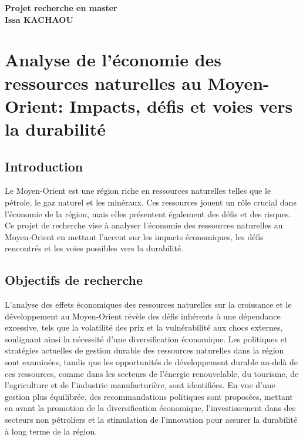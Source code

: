 \documentclass[a4paper, 12pt]{report}
\begin{document}
\thispagestyle{empty}	
\begin{center}
	\vspace*{5cm}\Huge{{\sc\textbf{Projet recherche en master}}} \\ \vspace*{5cm}
	\textbf{Issa KACHAOU}
\end{center}


\newpage

\chapter*{Analyse de l'économie des ressources naturelles au Moyen-Orient: Impacts, défis et voies vers la durabilité}

\section*{Introduction}

Le Moyen-Orient est une région riche en ressources naturelles telles que le pétrole, le gaz naturel et les minéraux. Ces ressources jouent un rôle crucial dans l'économie de la région, mais elles présentent également des défis et des risques. Ce projet de recherche vise à analyser l'économie des ressources naturelles au Moyen-Orient en mettant l'accent sur les impacts économiques, les défis rencontrés et les voies possibles vers la durabilité.

\section*{Objectifs de recherche}

L'analyse des effets économiques des ressources naturelles sur la croissance et le développement au Moyen-Orient révèle des défis inhérents à une dépendance excessive, tels que la volatilité des prix et la vulnérabilité aux chocs externes, soulignant ainsi la nécessité d'une diversification économique. Les politiques et stratégies actuelles de gestion durable des ressources naturelles dans la région sont examinées, tandis que les opportunités de développement durable au-delà de ces ressources, comme dans les secteurs de l'énergie renouvelable, du tourisme, de l'agriculture et de l'industrie manufacturière, sont identifiées. En vue d'une gestion plus équilibrée, des recommandations politiques sont proposées, mettant en avant la promotion de la diversification économique, l'investissement dans des secteurs non pétroliers et la stimulation de l'innovation pour assurer la durabilité à long terme de la région.
\end{document}
